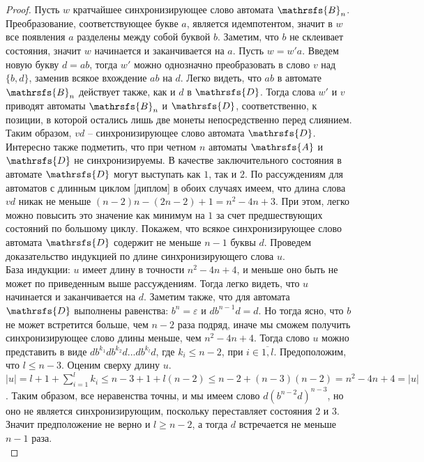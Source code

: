\documentclass[11pt]{article}
\begin{document}
\begin{proof}

Пусть $w$ кратчайшее синхронизирующее слово автомата $\mathrsfs{B}_n$.
Преобразование, соответствующее букве $a$, является идемпотентом,
значит в $w$ все появления $a$ разделены между собой буквой $b$. Заметим, что $b$ не склеивает состояния, значит
$w$ начинается и заканчивается на $a$. Пусть $w = w'a$.
Введем новую букву $d = ab$, тогда $w'$ можно однозначно преобразовать в слово $v$ над $\{b,d\}$, заменив всякое 
вхождение $ab$ на $d$. Легко видеть, что $ab$ в автомате $\mathrsfs{B}_n$ действует также, как и $d$ в $\mathrsfs{D}$.
Тогда слова $w'$ и $v$ приводят автоматы $\mathrsfs{B}_n$ и $\mathrsfs{D}$, соответственно, к позиции, в которой остались лишь две монеты
непосредственно перед слиянием. Таким образом, $vd$ -- синхронизирующее слово автомата $\mathrsfs{D}$. Интересно также подметить,
что при четном $n$ автоматы $\mathrsfs{A}$ и $\mathrsfs{D}$ не синхронизируемы.
В качестве заключительного состояния в автомате $\mathrsfs{D}$ могут выступать как $1$, так и $2$.
По рассуждениям для автоматов с длинным циклом [диплом] в обоих случаях имеем, что длина слова $vd$ никак не 
меньше $(n - 2)n - (2n - 2) + 1 = n^2 - 4n + 3$.
При этом, легко можно повысить это значение как минимум на $1$ за счет предшествующих состояний по большому циклу.
Покажем, что всякое синхронизирующее слово автомата $\mathrsfs{D}$ содержит не меньше $n - 1$ буквы $d$.
Проведем доказательство индукцией по длине синхронизирующего слова $u$.\\
База индукции: $u$ имеет длину в точности $n^2 - 4n + 4$, и меньше оно быть не может по приведенным выше рассуждениям.
Тогда легко видеть, что $u$ начинается и заканчивается на $d$. Заметим также, что для автомата $\mathrsfs{D}$ выполнены равенства:
$b^n = \varepsilon$ и $db^{n - 1}d = d$. Но тогда ясно, что $b$ не может встретится больше, чем $n - 2$ раза подряд, иначе мы 
сможем получить синхронизирующее слово длины меньше, чем $n^2 - 4n + 4$.
Тогда слово $u$ можно представить в виде $db^{k_1}db^{k_2}d...db^{k_l}d$, где $k_i \leq n - 2$, при $i \in \overline{1,l}$.
Предоположим, что $l \leq n - 3$.
Оценим сверху длину $u$. $|u| = l + 1 + \sum\limits_{i = 1}^{l}k_i \leq n - 3 + 1 + l(n - 2) \leq n - 2 + (n - 3)(n - 2) = n^2 - 4n + 4 = |u|$.
Таким образом, все неравенства точны, и мы имеем слово $d(b^{n - 2}d)^{n - 3}$, 
но оно не является синхронизирующим, поскольку переставляет состояния $2$ и $3$. Значит предположение не верно и $l \geq n - 2$,
а тогда $d$ встречается не меньше $n - 1$ раза.\\

\end{proof}
\end{document}
